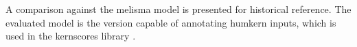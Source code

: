 
A comparison against the \gls{melisma} model is presented
for historical reference. The evaluated model is the version capable of annotating \gls{humkern} inputs, which is used in the \gls{kernscores} library \textcite{sapp2005online}.
